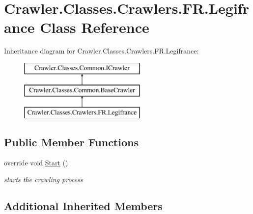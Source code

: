 \hypertarget{class_crawler_1_1_classes_1_1_crawlers_1_1_f_r_1_1_legifrance}{\section{Crawler.\-Classes.\-Crawlers.\-F\-R.\-Legifrance Class Reference}
\label{class_crawler_1_1_classes_1_1_crawlers_1_1_f_r_1_1_legifrance}
}
Inheritance diagram for Crawler.\-Classes.\-Crawlers.\-F\-R.\-Legifrance\-:\begin{figure}[H]
\begin{center}
\leavevmode
\includegraphics[height=3.000000cm]{class_crawler_1_1_classes_1_1_crawlers_1_1_f_r_1_1_legifrance}
\end{center}
\end{figure}
\subsection*{Public Member Functions}
\begin{DoxyCompactItemize}
\item 
override void \hyperlink{class_crawler_1_1_classes_1_1_crawlers_1_1_f_r_1_1_legifrance_a3d1a250e24dd357558ee282670ec601b}{Start} ()
\begin{DoxyCompactList}\small\item\em starts the crawling process \end{DoxyCompactList}\end{DoxyCompactItemize}
\subsection*{Additional Inherited Members}


